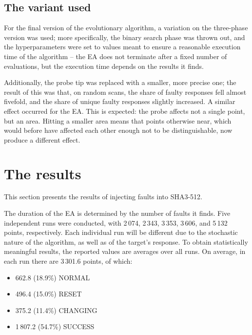 \documentclass[times, utf8, diplomski]{fer}
\begin{document}
\subsection{The variant used}
For the final version of the evolutionary algorithm, a variation on the
three-phase version was used; more specifically, the binary search phase
was thrown out, and the hyperparameters were set to values meant to ensure
a reasonable execution time of the algorithm -- the EA does not terminate
after a fixed number of evaluations, but the execution time depends on the
results it finds.

Additionally, the probe tip was replaced with a smaller, more precise one;
the result of this was that, on random scans, the share of faulty responses
fell almost fivefold, and the share of unique faulty responses slightly increased.
A similar effect occurred for the EA. This is expected: the probe affects not
a single point, but an area. Hitting a smaller area means that points otherwise
near, which would before have affected each other enough not to be distinguishable,
now produce a different effect.


\section{The results}\label{sec:results}
This section presents the results of injecting faults into SHA3-512.

%

The duration of the EA is determined by the number of faults it finds.
Five independent runs were conducted, with 2\,074, 2\,343, 3\,353, 3\,606,
and 5\,132 points, respectively. Each individual run will be different due
to the stochastic nature of the algorithm, as well as of the target's response.
To obtain statistically meaningful results, the reported values are averages over all runs.
On average, in each run there are 3\,301.6 points, of which:
\begin{itemize}
	\item 662.8  (18.9\%) NORMAL
	\item 496.4  (15.0\%) RESET
	\item 375.2  (11.4\%) CHANGING
	\item 1\,807.2 (54.7\%) SUCCESS
\end{itemize}
\end{document}
